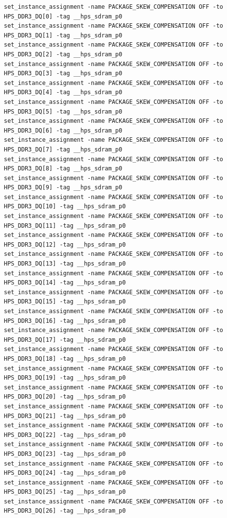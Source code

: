 \documentclass[conference]{IEEEtran}
\begin{document}
\begin{lstlisting}
set_instance_assignment -name PACKAGE_SKEW_COMPENSATION OFF -to HPS_DDR3_DQ[0] -tag __hps_sdram_p0
set_instance_assignment -name PACKAGE_SKEW_COMPENSATION OFF -to HPS_DDR3_DQ[1] -tag __hps_sdram_p0
set_instance_assignment -name PACKAGE_SKEW_COMPENSATION OFF -to HPS_DDR3_DQ[2] -tag __hps_sdram_p0
set_instance_assignment -name PACKAGE_SKEW_COMPENSATION OFF -to HPS_DDR3_DQ[3] -tag __hps_sdram_p0
set_instance_assignment -name PACKAGE_SKEW_COMPENSATION OFF -to HPS_DDR3_DQ[4] -tag __hps_sdram_p0
set_instance_assignment -name PACKAGE_SKEW_COMPENSATION OFF -to HPS_DDR3_DQ[5] -tag __hps_sdram_p0
set_instance_assignment -name PACKAGE_SKEW_COMPENSATION OFF -to HPS_DDR3_DQ[6] -tag __hps_sdram_p0
set_instance_assignment -name PACKAGE_SKEW_COMPENSATION OFF -to HPS_DDR3_DQ[7] -tag __hps_sdram_p0
set_instance_assignment -name PACKAGE_SKEW_COMPENSATION OFF -to HPS_DDR3_DQ[8] -tag __hps_sdram_p0
set_instance_assignment -name PACKAGE_SKEW_COMPENSATION OFF -to HPS_DDR3_DQ[9] -tag __hps_sdram_p0
set_instance_assignment -name PACKAGE_SKEW_COMPENSATION OFF -to HPS_DDR3_DQ[10] -tag __hps_sdram_p0
set_instance_assignment -name PACKAGE_SKEW_COMPENSATION OFF -to HPS_DDR3_DQ[11] -tag __hps_sdram_p0
set_instance_assignment -name PACKAGE_SKEW_COMPENSATION OFF -to HPS_DDR3_DQ[12] -tag __hps_sdram_p0
set_instance_assignment -name PACKAGE_SKEW_COMPENSATION OFF -to HPS_DDR3_DQ[13] -tag __hps_sdram_p0
set_instance_assignment -name PACKAGE_SKEW_COMPENSATION OFF -to HPS_DDR3_DQ[14] -tag __hps_sdram_p0
set_instance_assignment -name PACKAGE_SKEW_COMPENSATION OFF -to HPS_DDR3_DQ[15] -tag __hps_sdram_p0
set_instance_assignment -name PACKAGE_SKEW_COMPENSATION OFF -to HPS_DDR3_DQ[16] -tag __hps_sdram_p0
set_instance_assignment -name PACKAGE_SKEW_COMPENSATION OFF -to HPS_DDR3_DQ[17] -tag __hps_sdram_p0
set_instance_assignment -name PACKAGE_SKEW_COMPENSATION OFF -to HPS_DDR3_DQ[18] -tag __hps_sdram_p0
set_instance_assignment -name PACKAGE_SKEW_COMPENSATION OFF -to HPS_DDR3_DQ[19] -tag __hps_sdram_p0
set_instance_assignment -name PACKAGE_SKEW_COMPENSATION OFF -to HPS_DDR3_DQ[20] -tag __hps_sdram_p0
set_instance_assignment -name PACKAGE_SKEW_COMPENSATION OFF -to HPS_DDR3_DQ[21] -tag __hps_sdram_p0
set_instance_assignment -name PACKAGE_SKEW_COMPENSATION OFF -to HPS_DDR3_DQ[22] -tag __hps_sdram_p0
set_instance_assignment -name PACKAGE_SKEW_COMPENSATION OFF -to HPS_DDR3_DQ[23] -tag __hps_sdram_p0
set_instance_assignment -name PACKAGE_SKEW_COMPENSATION OFF -to HPS_DDR3_DQ[24] -tag __hps_sdram_p0
set_instance_assignment -name PACKAGE_SKEW_COMPENSATION OFF -to HPS_DDR3_DQ[25] -tag __hps_sdram_p0
set_instance_assignment -name PACKAGE_SKEW_COMPENSATION OFF -to HPS_DDR3_DQ[26] -tag __hps_sdram_p0

\end{lstlisting}
\end{document}
